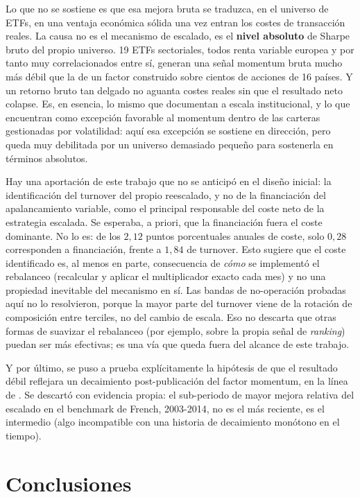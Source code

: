\documentclass[12pt]{report} %
\begin{document}
Lo que no se sostiene es que esa mejora bruta se traduzca, en el universo de ETFs, en una ventaja económica sólida una vez entran los costes de transacción reales. La causa no es el mecanismo de escalado, es el \textbf{nivel absoluto} de Sharpe bruto del propio universo. 19 ETFs sectoriales, todos renta variable europea y por tanto muy correlacionados entre sí, generan una señal momentum bruta mucho más débil que la de un factor construido sobre cientos de acciones de 16 países. Y un retorno bruto tan delgado no aguanta costes reales sin que el resultado neto colapse. Es, en esencia, lo mismo que documentan \citet{frazzini2018} a escala institucional, y lo que \citet{cederburg2020} encuentran como excepción favorable al momentum dentro de las carteras gestionadas por volatilidad: aquí esa excepción se sostiene en dirección, pero queda muy debilitada por un universo demasiado pequeño para sostenerla en términos absolutos.

Hay una aportación de este trabajo que no se anticipó en el diseño inicial: la identificación del turnover del propio reescalado, y no de la financiación del apalancamiento variable, como el principal responsable del coste neto de la estrategia escalada. Se esperaba, a priori, que la financiación fuera el coste dominante. No lo es: de los $2{,}12$ puntos porcentuales anuales de coste, solo $0{,}28$ corresponden a financiación, frente a $1{,}84$ de turnover. Esto sugiere que el coste identificado es, al menos en parte, consecuencia de \textit{cómo} se implementó el rebalanceo (recalcular y aplicar el multiplicador exacto cada mes) y no una propiedad inevitable del mecanismo en sí. Las bandas de no-operación probadas aquí no lo resolvieron, porque la mayor parte del turnover viene de la rotación de composición entre terciles, no del cambio de escala. Eso no descarta que otras formas de suavizar el rebalanceo (por ejemplo, sobre la propia señal de \textit{ranking}) puedan ser más efectivas; es una vía que queda fuera del alcance de este trabajo.

Y por último, se puso a prueba explícitamente la hipótesis de que el resultado débil reflejara un decaimiento post-publicación del factor momentum, en la línea de \citet{mcleanpontiff2016}. Se descartó con evidencia propia: el sub-periodo de mayor mejora relativa del escalado en el benchmark de French, 2003-2014, no es el más reciente, es el intermedio (algo incompatible con una historia de decaimiento monótono en el tiempo).

\section{Conclusiones}
\end{document}
